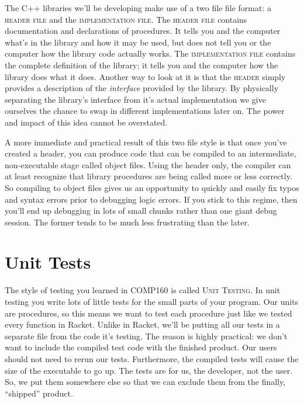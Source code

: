 \documentclass[]{tufte-handout}
\begin{document}
The C++ libraries we'll be developing make use of a two file file format: a \textsc{header file} and the \textsc{implementation file}. The \textsc{header file} contains documentation and declarations of procedures.  It tells you and the computer what's in the library and how it may be used, but does not tell you or the computer how the library code actually works.  The \textsc{implementation file} contains the complete definition of the library; it tells you and the computer how the library does what it does.  Another way to look at it is that the \textsc{header} simply provides a description of the \textit{interface} provided by the library.  By physically separating the library's interface from it's actual implementation we give ourselves the chance to swap in different implementations later on.  The power and impact of this idea cannot be overstated.  

A more immediate and practical result of this two file style is that once you've created a header, you can produce code that can be compiled to an intermediate, non-executable stage called object files. Using the header only, the compiler can at least recognize that library procedures are being called more or less correctly.  So compiling to object files gives us an opportunity to  quickly and easily fix typos and syntax errors prior to debugging logic errors.  If you stick to this regime, then you'll end up debugging in lots of small chunks rather than one giant debug session. The former tends to be much less frustrating than the later. 
 
\section{Unit Tests}

The style of testing you learned in COMP160 is called \textsc{Unit Testing}. In unit testing you write lots of little tests for the small parts of your program.  Our units are procedures, so this means we want to test each procedure just like we tested every function in Racket.  Unlike in Racket, we'll be putting all our tests in a separate file from the code it's testing.  The reason is highly practical: we don't want to include the compiled test code with the finished product. Our users should not need to rerun our tests. Furthermore, the compiled tests will cause the size of the executable to go up.  The tests are for us, the developer, not the user. So, we put them somewhere else so that we can exclude them from the finally, ``shipped'' product. 
\end{document}
